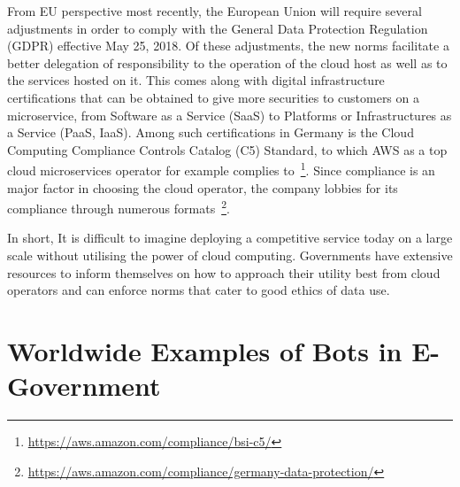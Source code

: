 From EU perspective most recently, the European Union will require several adjustments in order to comply with the %
General Data Protection Regulation (GDPR) effective May 25, 2018. Of these adjustments, the new norms facilitate a better delegation of responsibility to the operation of the cloud host as well as to the services hosted on it.
This comes along with digital infrastructure certifications that can be obtained to give more securities to customers on a microservice, %
from Software as a Service (SaaS) to Platforms or Infrastructures as a Service (PaaS, IaaS). %
Among such certifications in Germany is the Cloud Computing Compliance Controls Catalog (C5) Standard, to which AWS as a top cloud microservices operator for example complies to~\footnote{\url{https://aws.amazon.com/compliance/bsi-c5/}}. Since compliance is an major factor in choosing the cloud operator, the company lobbies for its compliance through numerous formats~\footnote{\url{https://aws.amazon.com/compliance/germany-data-protection/}}.

In short, It is difficult to imagine deploying a competitive service today on a large scale without utilising the power of cloud computing. Governments have extensive resources to inform themselves on how to approach their utility best from cloud operators and can enforce norms that cater to good ethics of data use.


\section{Worldwide Examples of Bots in E-Government}

